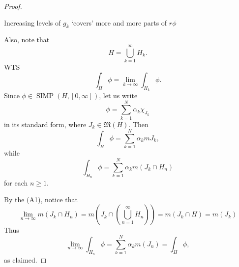 \documentclass[notoc,notitlepage]{tufte-book}
\DeclareMathOperator{\SIMP}{SIMP}
\begin{document}
\begin{proof}
\begin{marginfigure}
    \caption{Increasing levels of $g_k$ `covers' more and more parts of $r\phi$}\label{fig:increasing_levels_of_g_k_covers_more_and_more_parts_of_rphi_}
  \end{marginfigure}
  Also, note that
  \begin{equation*}
    H = \bigcup_{k=1}^{\infty} H_k.
  \end{equation*}
  \newpage
  WTS
  \begin{equation*}
    \int_{H} \phi = \lim_{k \to \infty} \int_{H_k} \phi.
  \end{equation*}
  Since $\phi \in \SIMP(H, [0, \infty])$, let us write
  \begin{equation*}
    \phi = \sum_{k=1}^{N} \alpha_k \chi_{J_k}
  \end{equation*}
  in its standard form, where $J_k \in \mathfrak{M}(H)$. Then
  \begin{equation*}
    \int_{H} \phi = \sum_{k=1}^{N} \alpha_k mJ_k,
  \end{equation*}
  while
  \begin{equation*}
    \int_{H_n} \phi = \sum_{k=1}^{N} \alpha_k m(J_k \cap H_n)
  \end{equation*}
  for each $n \geq 1$.

  By the  (A1), notice that
  \begin{equation*}
    \lim_{n \to \infty} m(J_k \cap H_n)
    = m\left(J_k \cap \left( \bigcup_{n=1}^{\infty} H_n \right) \right) 
    = m(J_k \cap H) = m(J_k)
  \end{equation*}
  Thus
  \begin{equation*}
    \lim_{n \to \infty} \int_{H_n} \phi = \sum_{k=1}^{N} \alpha_k m(J_n) =
    \int_{H} \phi,
  \end{equation*}
  as claimed.


\end{proof}
\end{document}
